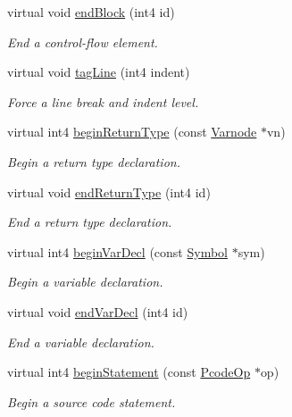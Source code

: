 \begin{DoxyCompactItemize}
virtual void \mbox{\hyperlink{class_emit_no_xml_ad9520b535d33c3501331078dbb97351b}{end\+Block}} (int4 id)
\begin{DoxyCompactList}\small\item\em End a control-\/flow element. \end{DoxyCompactList}\item 
virtual void \mbox{\hyperlink{class_emit_no_xml_a3b6ea3b42908f2d7e6e18ece69d24273}{tag\+Line}} (int4 indent)
\begin{DoxyCompactList}\small\item\em Force a line break and indent level. \end{DoxyCompactList}\item 
virtual int4 \mbox{\hyperlink{class_emit_no_xml_a6f9c0d9a1be5e530a503fbc1e7b79687}{begin\+Return\+Type}} (const \mbox{\hyperlink{class_varnode}{Varnode}} $\ast$vn)
\begin{DoxyCompactList}\small\item\em Begin a return type declaration. \end{DoxyCompactList}\item 
virtual void \mbox{\hyperlink{class_emit_no_xml_a6183514c884bc929fbcde10449db6096}{end\+Return\+Type}} (int4 id)
\begin{DoxyCompactList}\small\item\em End a return type declaration. \end{DoxyCompactList}\item 
virtual int4 \mbox{\hyperlink{class_emit_no_xml_a5d3a356f62dc06efc46b35fc969323ae}{begin\+Var\+Decl}} (const \mbox{\hyperlink{class_symbol}{Symbol}} $\ast$sym)
\begin{DoxyCompactList}\small\item\em Begin a variable declaration. \end{DoxyCompactList}\item 
virtual void \mbox{\hyperlink{class_emit_no_xml_ae6d306b10be8c8dfc62cea71ab2272b9}{end\+Var\+Decl}} (int4 id)
\begin{DoxyCompactList}\small\item\em End a variable declaration. \end{DoxyCompactList}\item 
virtual int4 \mbox{\hyperlink{class_emit_no_xml_a7c1115232ea297625c223fa6237f420f}{begin\+Statement}} (const \mbox{\hyperlink{class_pcode_op}{Pcode\+Op}} $\ast$op)
\begin{DoxyCompactList}\small\item\em Begin a source code statement. \end{DoxyCompactList}\item 

\end{DoxyCompactItemize}
